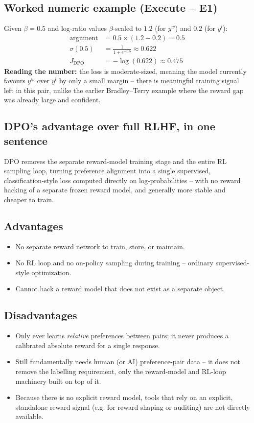 \documentclass[11pt]{article}
\begin{document}
\subsection{Worked numeric example (Execute -- E1)}
Given $\beta = 0.5$ and log-ratio values $\beta$-scaled to $1.2$ (for $y^w$) and
$0.2$ (for $y^l$):
\begin{align*}
\text{argument} &= 0.5 \times (1.2 - 0.2) = 0.5 \\
\sigma(0.5) &= \frac{1}{1+e^{-0.5}} \approx 0.622 \\
J_{\text{DPO}} &= -\log(0.622) \approx 0.475
\end{align*}
\textbf{Reading the number:} the loss is moderate-sized, meaning the model
currently favours $y^w$ over $y^l$ by only a small margin -- there is meaningful
training signal left in this pair, unlike the earlier Bradley--Terry example
where the reward gap was already large and confident.

\subsection{DPO's advantage over full RLHF, in one sentence}
DPO removes the separate reward-model training stage and the entire RL sampling
loop, turning preference alignment into a single supervised, classification-style
loss computed directly on log-probabilities -- with no reward hacking of a
separate frozen reward model, and generally more stable and cheaper to train.

\subsection{Advantages}
\begin{itemize}
  \item No separate reward network to train, store, or maintain.
  \item No RL loop and no on-policy sampling during training -- ordinary
  supervised-style optimization.
  \item Cannot hack a reward model that does not exist as a separate object.
\end{itemize}

\subsection{Disadvantages}
\begin{itemize}
  \item Only ever learns \emph{relative} preferences between pairs; it never
  produces a calibrated absolute reward for a single response.
  \item Still fundamentally needs human (or AI) preference-pair data -- it does
  not remove the labelling requirement, only the reward-model and RL-loop
  machinery built on top of it.
  \item Because there is no explicit reward model, tools that rely on an
  explicit, standalone reward signal (e.g. for reward shaping or auditing) are
  not directly available.
\end{itemize}
\end{document}
